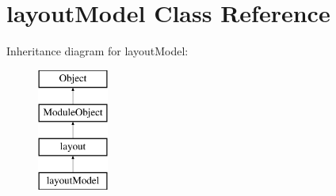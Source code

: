 \hypertarget{classlayoutModel}{\section{layout\+Model Class Reference}
\label{classlayoutModel}
}
Inheritance diagram for layout\+Model\+:\begin{figure}[H]
\begin{center}
\leavevmode
\includegraphics[height=4.000000cm]{classlayoutModel}
\end{center}
\end{figure}
